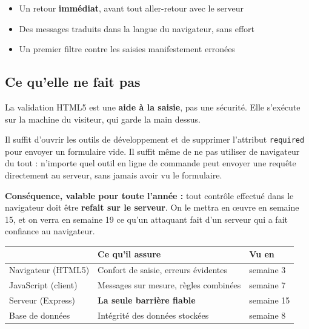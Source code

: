 \documentclass[a4paper,11pt]{article}
\newcommand{\hdr}[1]{\multicolumn{1}{l}{\color{white}\bfseries #1}}
\renewcommand{\arraystretch}{1.3}
\begin{document}
\begin{itemize}
  \item Un retour \textbf{immédiat}, avant tout aller-retour avec le serveur
  \item Des messages traduits dans la langue du navigateur, sans effort
  \item Un premier filtre contre les saisies manifestement erronées
\end{itemize}

\subsection{Ce qu'elle ne fait pas}

\begin{tcolorbox}[interdit, title={Une validation côté navigateur ne protège rien}]
La validation HTML5 est une \textbf{aide à la saisie}, pas une sécurité. Elle s'exécute sur la machine du visiteur, qui garde la main dessus.

\vspace{4pt}
Il suffit d'ouvrir les outils de développement et de supprimer l'attribut \texttt{required} pour envoyer un formulaire vide. Il suffit même de ne pas utiliser de navigateur du tout : n'importe quel outil en ligne de commande peut envoyer une requête directement au serveur, sans jamais avoir vu le formulaire.

\vspace{4pt}
\textbf{Conséquence, valable pour toute l'année :} tout contrôle effectué dans le navigateur doit être \textbf{refait sur le serveur}. On le mettra en \oe uvre en semaine 15, et on verra en semaine 19 ce qu'un attaquant fait d'un serveur qui a fait confiance au navigateur.
\end{tcolorbox}

\vspace{4pt}
\begin{center}
\renewcommand{\arraystretch}{1.0}
\begin{tabularx}{\linewidth}{p{3.6cm}Xp{2.2cm}}
  \toprule
  \rowcolor{uniNavy}
  \hdr{Niveau de contrôle} & \hdr{Ce qu'il assure} & \hdr{Vu en} \\
  \midrule
  \rowcolor{uniPaper}
  Navigateur (HTML5) & Confort de saisie, erreurs évidentes & semaine 3 \\
  JavaScript (client) & Messages sur mesure, règles combinées & semaine 7 \\
  \rowcolor{uniPaper}
  Serveur (Express) & \textbf{La seule barrière fiable} & semaine 15 \\
  Base de données & Intégrité des données stockées & semaine 8 \\
  \bottomrule
\end{tabularx}
\end{center}
\end{document}
